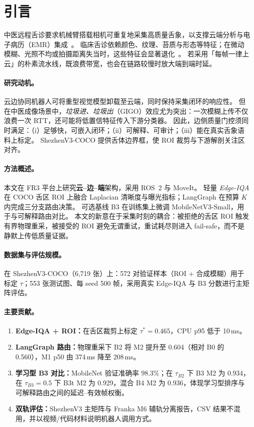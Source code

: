 \section{引言}
\label{sec:intro-zh}

中医远程舌诊要求机械臂搭载相机可重复地采集高质量舌象，以支撑云端分析与电子病历（EMR）集成~\cite{zhang2020tongue,qi2016tongue}。
临床舌诊依赖颜色、纹理、苔质与形态等特征；在微动模糊、光照不均或拍摄距离失当时，这些特征会显著退化~\cite{zhang2020tongue}。
若采用「每帧一律上云」的朴素流水线，既浪费带宽，也会在链路较慢时放大端到端时延。

\paragraph{研究动机。}
云边协同机器人可将重型视觉模型卸载至云端，同时保持采集闭环的响应性。
但在中医成像场景中，\emph{垃圾进、垃圾出}（GIGO）效应尤为突出：一次模糊上传不仅浪费一次 RTT，还可能将低置信特征传入下游分类器。
因此，边侧质量门控须同时满足：（i）足够快，可嵌入闭环；（ii）可解释、可审计；（iii）能在真实舌象语料上标定。
ShezhenV3-COCO 提供舌体边界框，使 ROI 裁剪与下游解剖关注区对齐。

\paragraph{方法概述。}
本文在 FR3 平台上研究\textbf{云--边--端}架构，采用 ROS~2 与 MoveIt。
轻量 \emph{Edge-IQA} 在 COCO 舌区 ROI 上融合 Laplacian 清晰度与曝光指标；LangGraph 在预算 $K$ 内完成三分支路由决策。
可选基线 B3 在训练集上微调 MobileNetV3-Small，用于与可解释路由对比。
本文的新意在于采集时刻的耦合：被拒绝的舌区 ROI 触发有界物理重采，被接受的 ROI 避免无谓重试，重试耗尽则进入 fail-safe，而不是静默上传低质量证据。

\paragraph{数据集与评估规模。}
在 ShezhenV3-COCO（6{,}719 张）上：572 对验证样本（ROI + 合成模糊）用于标定 $\tau$；553 张测试图、每 seed 500 帧，采用真实 Edge-IQA 与 B3 分数进行主矩阵评估。

\paragraph{主要贡献。}
\begin{enumerate}
  \item \textbf{Edge-IQA + ROI：}在舌区裁剪上标定 $\tau^\ast{=}0.465$，CPU p95 低于 10\,ms。
  \item \textbf{LangGraph 路由：}物理重采下 B2 将 M2 提升至 0.604（相对 B0 的 0.560），M1 p50 由 374\,ms 降至 208\,ms。
  \item \textbf{学习型 B3 对比：}MobileNet 验证准确率 98.3\%；在 $\tau_{B2}$ 下 B3 M2 为 0.934，在 $\tau_{B3}{=}0.5$ 下 B3t M2 为 0.929，混合 B4 M2 为 0.936，体现学习型排序与可解释路由之间的延迟--有效帧权衡。
  \item \textbf{双轨评估：}ShezhenV3 主矩阵与 Franka M6 辅轨分离报告，CSV 结果不混用，并以视频/代码材料说明机器人调用方式。
\end{enumerate}

